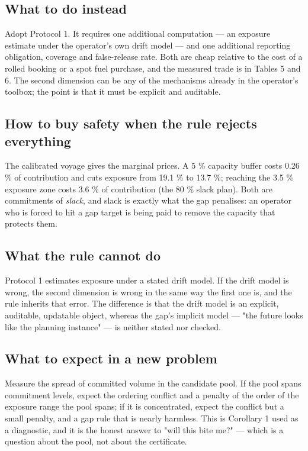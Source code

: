 \documentclass[preprint,12pt,letterpaper]{elsarticle}
\theoremstyle{definition}
\theoremstyle{plain}
\begin{document}
\subsection{What to do instead}

Adopt Protocol 1. It requires one additional computation --- an exposure estimate under the operator's own drift model --- and one additional reporting obligation, coverage and false-release rate. Both are cheap relative to the cost of a rolled booking or a spot fuel purchase, and the measured trade is in Tables 5 and 6. The second dimension can be any of the mechanisms already in the operator's toolbox; the point is that it must be explicit and auditable.

\subsection{How to buy safety when the rule rejects everything}

The calibrated voyage gives the marginal prices. A 5 \% capacity buffer costs 0.26 \% of contribution and cuts exposure from 19.1 \% to 13.7 \%; reaching the 3.5 \% exposure zone costs 3.6 \% of contribution (the 80 \% slack plan). Both are commitments of \textit{slack}, and slack is exactly what the gap penalises: an operator who is forced to hit a gap target is being paid to remove the capacity that protects them.

\subsection{What the rule cannot do}

Protocol 1 estimates exposure under a stated drift model. If the drift model is wrong, the second dimension is wrong in the same way the first one is, and the rule inherits that error. The difference is that the drift model is an explicit, auditable, updatable object, whereas the gap's implicit model --- "the future looks like the planning instance" --- is neither stated nor checked.

\subsection{What to expect in a new problem}

Measure the spread of committed volume in the candidate pool. If the pool spans commitment levels, expect the ordering conflict and a penalty of the order of the exposure range the pool spans; if it is concentrated, expect the conflict but a small penalty, and a gap rule that is nearly harmless. This is Corollary 1 used as a diagnostic, and it is the honest answer to "will this bite me?" --- which is a question about the pool, not about the certificate.
\end{document}
